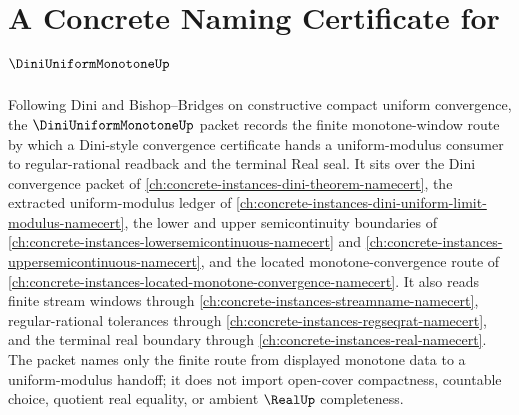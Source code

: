 \chapter{A Concrete Naming Certificate for $\DiniUniformMonotoneUp$}
\label{ch:concrete-instances-dini-uniform-monotone-namecert}

Following Dini and Bishop--Bridges on constructive compact uniform convergence, the $\DiniUniformMonotoneUp$ packet records the finite monotone-window route by which a Dini-style convergence certificate hands a uniform-modulus consumer to regular-rational readback and the terminal Real seal. It sits over the Dini convergence packet of \autoref{ch:concrete-instances-dini-theorem-namecert}, the extracted uniform-modulus ledger of \autoref{ch:concrete-instances-dini-uniform-limit-modulus-namecert}, the lower and upper semicontinuity boundaries of \autoref{ch:concrete-instances-lowersemicontinuous-namecert} and \autoref{ch:concrete-instances-uppersemicontinuous-namecert}, and the located monotone-convergence route of \autoref{ch:concrete-instances-located-monotone-convergence-namecert}. It also reads finite stream windows through \autoref{ch:concrete-instances-streamname-namecert}, regular-rational tolerances through \autoref{ch:concrete-instances-regseqrat-namecert}, and the terminal real boundary through \autoref{ch:concrete-instances-real-namecert}. The packet names only the finite route from displayed monotone data to a uniform-modulus handoff; it does not import open-cover compactness, countable choice, quotient real equality, or ambient $\RealUp$ completeness.

